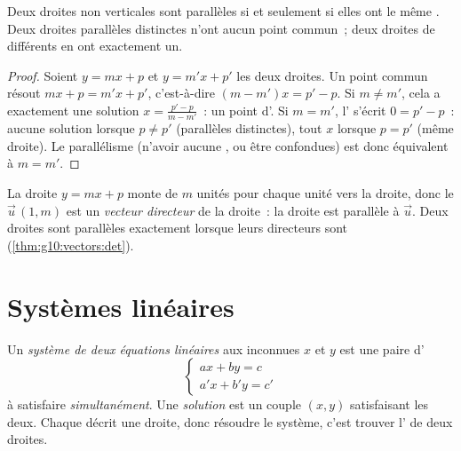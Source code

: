 \begin{proposition}\label{prop:g10:lines:parallel}
Deux droites non verticales sont parallèles si et seulement si elles ont
le même . Deux droites parallèles distinctes n'ont
aucun point commun~; deux droites de  différents
en ont exactement un.
\end{proposition}

\begin{proof}
Soient $y = mx + p$ et $y = m'x + p'$ les deux droites. Un point commun
résout $mx + p = m'x + p'$, c'est-à-dire $(m - m')x = p' - p$. Si
$m \neq m'$, cela a exactement une solution
$x = \frac{p' - p}{m - m'}$~: un point d'. Si $m = m'$,
l' s'écrit $0 = p' - p$~: aucune solution lorsque $p \neq p'$
(parallèles distinctes), tout $x$ lorsque $p = p'$ (même droite). Le
parallélisme (n'avoir aucune , ou être confondues) est donc
équivalent à $m = m'$.
\end{proof}

\begin{remark}
La droite $y = mx + p$ monte de $m$ unités pour chaque unité vers la
droite, donc le  $\vec u\,(1, m)$ est un \emph{vecteur
directeur} de la droite~: la droite est
parallèle à $\vec u$. Deux droites sont parallèles exactement lorsque
leurs  directeurs sont 
(\cref{thm:g10:vectors:det}).
\end{remark}

\section{Systèmes linéaires}

\begin{definition}\label{def:g10:lines:system}
Un \emph{système de deux équations linéaires} aux
inconnues $x$ et $y$ est une paire d'
\[
\begin{cases}
a x + b y = c \\
a' x + b' y = c'
\end{cases}
\]
à satisfaire \emph{simultanément}. Une \emph{solution} est un couple
$(x, y)$ satisfaisant les deux. Chaque  décrit une droite, donc
résoudre le système, c'est trouver l' de deux droites.
\end{definition}

